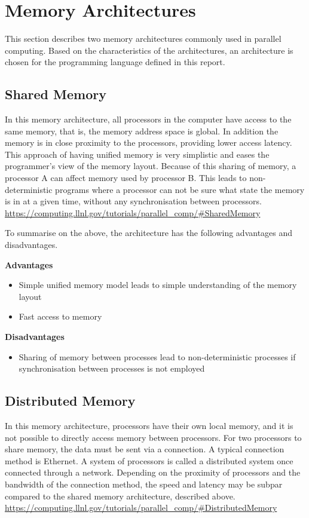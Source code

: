 \section{Memory Architectures}

This section describes two memory architectures commonly used in parallel computing. Based on the characteristics of the architectures, an architecture is chosen for the programming language defined in this report.

\subsection{Shared Memory}

In this memory architecture, all processors in the computer have access to the same memory, that is, the memory address space is global. In addition the memory is in close proximity to the processors, providing lower access latency. This approach of having unified memory is very simplistic and eases the programmer's view of the memory layout.
Because of this sharing of memory, a processor A can affect memory used by processor B. This leads to non-deterministic programs where a processor can not be sure what state the memory is in at a given time, without any synchronisation between processors. 
\url{https://computing.llnl.gov/tutorials/parallel_comp/#SharedMemory}

To summarise on the above, the architecture has the following advantages and disadvantages. 

\noindent\textbf{Advantages}
\begin{itemize}
    \item Simple unified memory model leads to simple understanding of the memory layout
    \item Fast access to memory
\end{itemize}

\noindent\textbf{Disadvantages}
\begin{itemize}
    \item Sharing of memory between processes lead to non-deterministic processes if synchronisation between processes is not employed
\end{itemize}

\subsection{Distributed Memory}

In this memory architecture, processors have their own local memory, and it is not possible to directly access memory between processors.
For two processors to share memory, the data must be sent via a connection. A typical connection method is Ethernet. A system of processors is called a distributed system once connected through a network. Depending on the proximity of processors and the bandwidth of the connection method, the speed and latency may be subpar compared to the shared memory architecture, described above. \url{https://computing.llnl.gov/tutorials/parallel_comp/#DistributedMemory}

